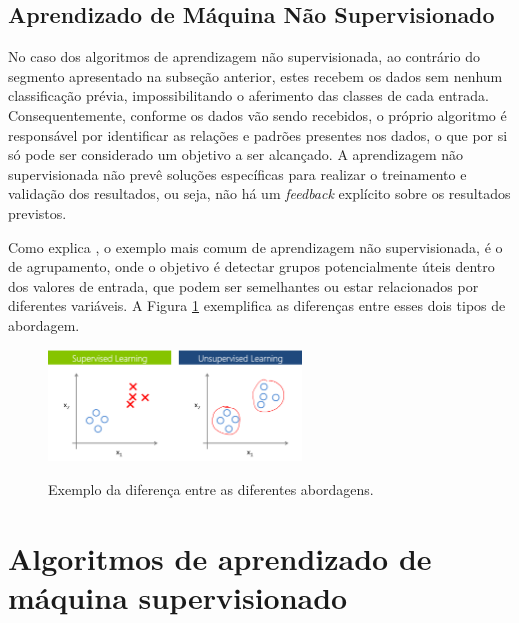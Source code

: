 \documentclass[oneside,openright,12pt]{ufsm_2015} %
\begin{document}

\subsection{Aprendizado de Máquina Não Supervisionado}
\label{sec:aprend-maquina-nao-sup}

\par No caso dos algoritmos de aprendizagem não supervisionada, ao contrário do segmento apresentado na subseção anterior, estes recebem os dados sem nenhum classificação prévia, impossibilitando o aferimento das classes de cada entrada. Consequentemente, conforme os dados vão sendo recebidos, o próprio algoritmo é responsável por identificar as relações e padrões presentes nos dados, o que por si só pode ser considerado um objetivo a ser alcançado. A aprendizagem não supervisionada não prevê soluções específicas para realizar o treinamento e validação dos resultados, ou seja, não há um \textit{feedback} explícito sobre os resultados previstos.

Como explica \cite{book:russell:10}, o exemplo mais comum de aprendizagem não supervisionada, é o de agrupamento, onde o objetivo é detectar grupos potencialmente úteis dentro dos valores de entrada, que podem ser semelhantes ou estar relacionados por diferentes variáveis. A Figura \ref{fig:aprend-nao-sup} exemplifica as diferenças entre esses dois tipos de abordagem.

\begin{figure}[ht]
     \caption{Exemplo da diferença entre as diferentes abordagens.}
\centering
\includegraphics[width=0.6\textwidth]{figuras/aprend-nao-sup.png}
\vspace{\baselineskip} %
\label{fig:aprend-nao-sup}
\end{figure}


\section{Algoritmos de aprendizado de máquina supervisionado}
\label{sec:alg-aprend-maquina-sup}
\end{document}
